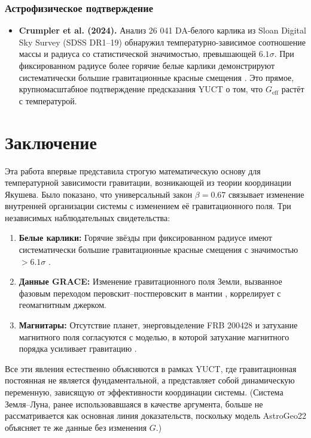 \documentclass[12pt]{article}
\theoremstyle{remark}
\begin{document}
	\subsubsection*{Астрофизическое подтверждение}
	
	\begin{itemize}
		\item \textbf{Crumpler et al. (2024).} Анализ 26 041 DA-белого карлика из Sloan Digital Sky Survey (SDSS DR1–19) обнаружил температурно-зависимое соотношение массы и радиуса со статистической значимостью, превышающей $6.1\sigma$. При фиксированном радиусе более горячие белые карлики демонстрируют систематически большие гравитационные красные смещения \cite{Crumpler2024}. Это прямое, крупномасштабное подтверждение предсказания YUCT о том, что $G_{\mathrm{eff}}$ растёт с температурой.
	\end{itemize}
	
	\section{Заключение}
	\label{sec:conclusion}
	
	Эта работа впервые представила строгую математическую основу для температурной зависимости гравитации, возникающей из теории координации Якушева. Было показано, что универсальный закон $\beta = 0.67$ связывает изменение внутренней организации системы с изменением её гравитационного поля. Три независимых наблюдательных свидетельства:
	\begin{enumerate}
		\item \textbf{Белые карлики:} Горячие звёзды при фиксированном радиусе имеют систематически большие гравитационные красные смещения с значимостью $>6.1\sigma$ \cite{Crumpler2024}.
		\item \textbf{Данные GRACE:} Изменение гравитационного поля Земли, вызванное фазовым переходом перовскит–постперовскит в мантии \cite{Rosat2025}, коррелирует с геомагнитным джерком.
		\item \textbf{Магнитары:} Отсутствие планет, энерговыделение FRB 200428 и затухание магнитного поля согласуются с моделью, в которой затухание магнитного порядка усиливает гравитацию \cite{Kaspi2017, Geng2020}.
	\end{enumerate}
	Все эти явления естественно объясняются в рамках YUCT, где гравитационная постоянная не является фундаментальной, а представляет собой динамическую переменную, зависящую от эффективности координации системы. (Система Земля–Луна, ранее использовавшаяся в качестве аргумента, больше не рассматривается как основная линия доказательств, поскольку модель AstroGeo22 объясняет те же данные без изменения $G$.)
	
\end{document}
